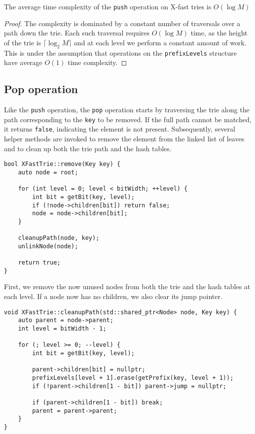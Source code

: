 \begin{lemma}
The average time complexity of the \texttt{push} operation on X-fast tries is \( O(\log M) \)
\end{lemma}

\begin{proof}
The complexity is dominated by a constant number of traversals over a path down the trie. Each such traversal requires \( O(\log M) \) time, as the height of the trie is \( \lceil \log_2 M \rceil \) and at each level we perform a constant amount of work. This is under the assumption that operations on the \texttt{prefixLevels} structure have average \( O(1) \) time complexity.
\end{proof}

\subsection{Pop operation}
Like the \texttt{push} operation, the \texttt{pop} operation starts by traversing the trie along the path corresponding to the \texttt{key} to be removed. If the full path cannot be matched, it returns \texttt{false}, indicating the element is not present. Subsequently, several helper methods are invoked to remove the element from the linked list of leaves and to clean up both the trie path and the hash tables.

\begin{verbatim}
bool XFastTrie::remove(Key key) {
    auto node = root;

    for (int level = 0; level < bitWidth; ++level) {
        int bit = getBit(key, level);
        if (!node->children[bit]) return false;
        node = node->children[bit];
    }

    cleanupPath(node, key);
    unlinkNode(node);

    return true;
}
\end{verbatim}

First, we remove the now unused nodes from both the trie and the hash tables at each level. If a node now has no children, we also clear its jump pointer.

\begin{verbatim}
void XFastTrie::cleanupPath(std::shared_ptr<Node> node, Key key) {
    auto parent = node->parent;
    int level = bitWidth - 1;

    for (; level >= 0; --level) {
        int bit = getBit(key, level);

        parent->children[bit] = nullptr;
        prefixLevels[level + 1].erase(getPrefix(key, level + 1));
        if (!parent->children[1 - bit]) parent->jump = nullptr;

        if (parent->children[1 - bit]) break;
        parent = parent->parent;
    }
}
\end{verbatim}

